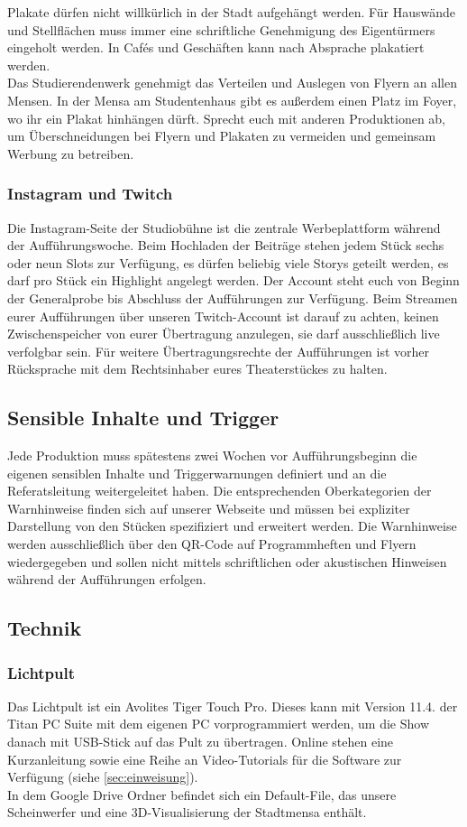 Plakate dürfen nicht willkürlich in der Stadt aufgehängt werden. Für Hauswände und Stellflächen muss immer eine schriftliche Genehmigung des Eigentürmers eingeholt werden. In Cafés und Geschäften kann nach Absprache plakatiert werden.	\\

Das Studierendenwerk genehmigt das Verteilen und Auslegen von Flyern an allen Mensen. In der Mensa am Studentenhaus gibt es außerdem einen Platz im Foyer, wo ihr ein Plakat hinhängen dürft. 
Sprecht euch mit anderen Produktionen ab, um Überschneidungen bei Flyern und Plakaten zu vermeiden und gemeinsam Werbung zu betreiben.

\subsubsection{Instagram und Twitch}
Die Instagram-Seite der Studiobühne ist die zentrale Werbeplattform während der Aufführungswoche. Beim Hochladen der Beiträge stehen jedem Stück sechs oder neun Slots zur Verfügung, es dürfen beliebig viele Storys geteilt werden, es darf pro Stück ein Highlight angelegt werden. Der Account steht euch von Beginn der Generalprobe bis Abschluss der Aufführungen zur Verfügung.
Beim Streamen eurer Aufführungen über unseren Twitch-Account ist darauf zu achten, keinen Zwischenspeicher von eurer Übertragung anzulegen, sie darf ausschließlich live verfolgbar sein. Für weitere Übertragungsrechte der Aufführungen ist vorher Rücksprache mit dem Rechtsinhaber eures Theaterstückes zu halten.	

\subsection{Sensible Inhalte und Trigger}
Jede Produktion muss spätestens zwei Wochen vor Aufführungsbeginn die eigenen sensiblen Inhalte und Triggerwarnungen definiert und an die Referatsleitung weitergeleitet haben.	
Die entsprechenden Oberkategorien der Warnhinweise finden sich auf unserer Webseite und müssen bei expliziter Darstellung von den Stücken spezifiziert und erweitert werden.
Die Warnhinweise werden ausschließlich über den QR-Code auf Programmheften und Flyern wiedergegeben und sollen nicht mittels schriftlichen oder akustischen Hinweisen während der Aufführungen erfolgen.

\subsection{Technik}
\subsubsection{Lichtpult}
Das Lichtpult ist ein Avolites Tiger Touch Pro. Dieses kann mit Version 11.4. der Titan PC Suite mit dem eigenen PC vorprogrammiert werden, um die Show danach mit USB-Stick auf das Pult zu übertragen. Online stehen eine Kurzanleitung sowie eine Reihe an Video-Tutorials für die Software zur Verfügung (siehe \ref{sec:einweisung}).\\
In dem Google Drive Ordner befindet sich ein Default-File, das unsere Scheinwerfer und eine 3D-Visualisierung der Stadtmensa enthält.

